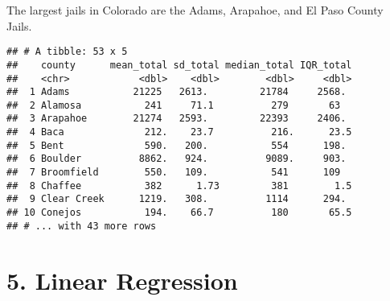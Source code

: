 \documentclass[
]{article}
\newenvironment{Shaded}{\begin{snugshade}}{\end{snugshade}}
\newcommand{\DataTypeTok}[1]{\textcolor[rgb]{0.13,0.29,0.53}{#1}}
\newcommand{\KeywordTok}[1]{\textcolor[rgb]{0.13,0.29,0.53}{\textbf{#1}}}
\newcommand{\NormalTok}[1]{#1}
\newcommand{\OperatorTok}[1]{\textcolor[rgb]{0.81,0.36,0.00}{\textbf{#1}}}
\newcommand{\StringTok}[1]{\textcolor[rgb]{0.31,0.60,0.02}{#1}}
\begin{document}
The largest jails in Colorado are the Adams, Arapahoe, and El Paso
County Jails.

\begin{Shaded}
\end{Shaded}

\begin{verbatim}
## # A tibble: 53 x 5
##    county      mean_total sd_total median_total IQR_total
##    <chr>            <dbl>    <dbl>        <dbl>     <dbl>
##  1 Adams           21225   2613.         21784     2568. 
##  2 Alamosa           241     71.1          279       63  
##  3 Arapahoe        21274   2593.         22393     2406. 
##  4 Baca              212.    23.7          216.      23.5
##  5 Bent              590.   200.           554      198. 
##  6 Boulder          8862.   924.          9089.     903. 
##  7 Broomfield        550.   109.           541      109  
##  8 Chaffee           382      1.73         381        1.5
##  9 Clear Creek      1219.   308.          1114      294. 
## 10 Conejos           194.    66.7          180       65.5
## # ... with 43 more rows
\end{verbatim}

\hypertarget{linear-regression}{%
\section{5. Linear Regression}\label{linear-regression}}

\begin{Shaded}
\end{Shaded}
\end{document}

